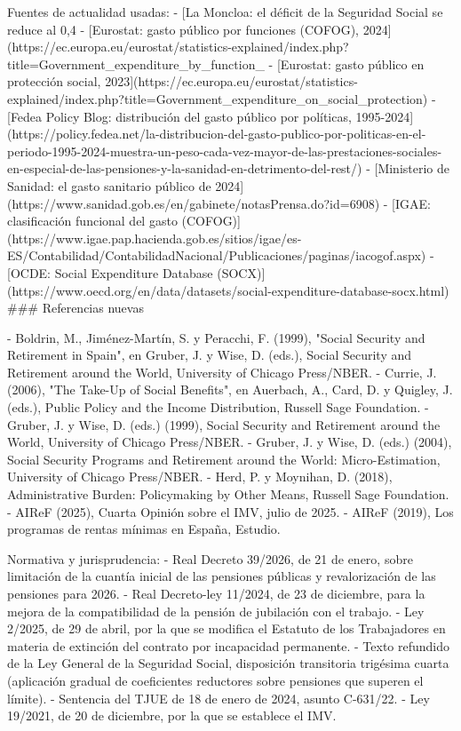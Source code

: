 \documentclass[10pt,a4paper]{article}
\begin{document}
Fuentes de actualidad usadas:
- [La Moncloa: el déficit de la Seguridad Social se reduce al 0,4%
- [Eurostat: gasto público por funciones (COFOG), 2024](https://ec.europa.eu/eurostat/statistics-explained/index.php?title=Government_expenditure_by_function_%
- [Eurostat: gasto público en protección social, 2023](https://ec.europa.eu/eurostat/statistics-explained/index.php?title=Government_expenditure_on_social_protection)
- [Fedea Policy Blog: distribución del gasto público por políticas, 1995-2024](https://policy.fedea.net/la-distribucion-del-gasto-publico-por-politicas-en-el-periodo-1995-2024-muestra-un-peso-cada-vez-mayor-de-las-prestaciones-sociales-en-especial-de-las-pensiones-y-la-sanidad-en-detrimento-del-rest/)
- [Ministerio de Sanidad: el gasto sanitario público de 2024](https://www.sanidad.gob.es/en/gabinete/notasPrensa.do?id=6908)
- [IGAE: clasificación funcional del gasto (COFOG)](https://www.igae.pap.hacienda.gob.es/sitios/igae/es-ES/Contabilidad/ContabilidadNacional/Publicaciones/paginas/iacogof.aspx)
- [OCDE: Social Expenditure Database (SOCX)](https://www.oecd.org/en/data/datasets/social-expenditure-database-socx.html)
### Referencias nuevas

- Boldrin, M., Jiménez-Martín, S. y Peracchi, F. (1999), "Social Security and Retirement in Spain", en Gruber, J. y Wise, D. (eds.), Social Security and Retirement around the World, University of Chicago Press/NBER.
- Currie, J. (2006), "The Take-Up of Social Benefits", en Auerbach, A., Card, D. y Quigley, J. (eds.), Public Policy and the Income Distribution, Russell Sage Foundation.
- Gruber, J. y Wise, D. (eds.) (1999), Social Security and Retirement around the World, University of Chicago Press/NBER.
- Gruber, J. y Wise, D. (eds.) (2004), Social Security Programs and Retirement around the World: Micro-Estimation, University of Chicago Press/NBER.
- Herd, P. y Moynihan, D. (2018), Administrative Burden: Policymaking by Other Means, Russell Sage Foundation.
- AIReF (2025), Cuarta Opinión sobre el IMV, julio de 2025.
- AIReF (2019), Los programas de rentas mínimas en España, Estudio.

Normativa y jurisprudencia:
- Real Decreto 39/2026, de 21 de enero, sobre limitación de la cuantía inicial de las pensiones públicas y revalorización de las pensiones para 2026.
- Real Decreto-ley 11/2024, de 23 de diciembre, para la mejora de la compatibilidad de la pensión de jubilación con el trabajo.
- Ley 2/2025, de 29 de abril, por la que se modifica el Estatuto de los Trabajadores en materia de extinción del contrato por incapacidad permanente.
- Texto refundido de la Ley General de la Seguridad Social, disposición transitoria trigésima cuarta (aplicación gradual de coeficientes reductores sobre pensiones que superen el límite).
- Sentencia del TJUE de 18 de enero de 2024, asunto C-631/22.
- Ley 19/2021, de 20 de diciembre, por la que se establece el IMV.
\end{document}
